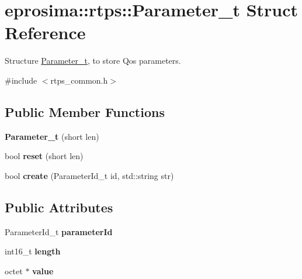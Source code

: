 \hypertarget{structeprosima_1_1rtps_1_1_parameter__t}{\section{eprosima\-:\-:rtps\-:\-:\-Parameter\-\_\-t \-Struct \-Reference}
\label{structeprosima_1_1rtps_1_1_parameter__t}
}


\-Structure \hyperlink{structeprosima_1_1rtps_1_1_parameter__t}{\-Parameter\-\_\-t}, to store \-Qos parameters.  




{\ttfamily \#include $<$rtps\-\_\-common.\-h$>$}

\subsection*{\-Public \-Member \-Functions}
\begin{DoxyCompactItemize}
\item 
\hypertarget{structeprosima_1_1rtps_1_1_parameter__t_a3a18bce43272d83e5629677aa0541389}{{\bfseries \-Parameter\-\_\-t} (short len)}\label{structeprosima_1_1rtps_1_1_parameter__t_a3a18bce43272d83e5629677aa0541389}

\item 
\hypertarget{structeprosima_1_1rtps_1_1_parameter__t_a15ebf482f77a05d2a0f2aeae5a13ff39}{bool {\bfseries reset} (short len)}\label{structeprosima_1_1rtps_1_1_parameter__t_a15ebf482f77a05d2a0f2aeae5a13ff39}

\item 
\hypertarget{structeprosima_1_1rtps_1_1_parameter__t_a3f0b4013f8bb45006178cfddf39e2180}{bool {\bfseries create} (\-Parameter\-Id\-\_\-t id, std\-::string str)}\label{structeprosima_1_1rtps_1_1_parameter__t_a3f0b4013f8bb45006178cfddf39e2180}

\end{DoxyCompactItemize}
\subsection*{\-Public \-Attributes}
\begin{DoxyCompactItemize}
\item 
\hypertarget{structeprosima_1_1rtps_1_1_parameter__t_a6e2d53c27b14991dce7de251d70e0662}{\-Parameter\-Id\-\_\-t {\bfseries parameter\-Id}}\label{structeprosima_1_1rtps_1_1_parameter__t_a6e2d53c27b14991dce7de251d70e0662}

\item 
\hypertarget{structeprosima_1_1rtps_1_1_parameter__t_a62e294e84d39755df2432247992b99a7}{int16\-\_\-t {\bfseries length}}\label{structeprosima_1_1rtps_1_1_parameter__t_a62e294e84d39755df2432247992b99a7}

\item 
\hypertarget{structeprosima_1_1rtps_1_1_parameter__t_a0b1bd9d3e00fd2708200efee51e8a1a9}{octet $\ast$ {\bfseries value}}\label{structeprosima_1_1rtps_1_1_parameter__t_a0b1bd9d3e00fd2708200efee51e8a1a9}

\end{DoxyCompactItemize}



